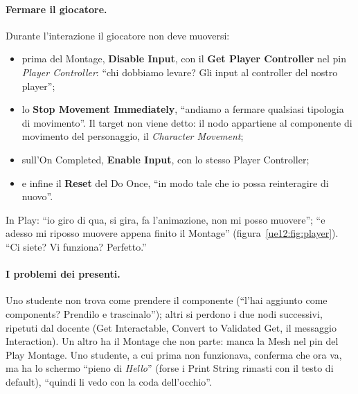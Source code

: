 \paragraph{Fermare il giocatore.} Durante l'interazione il giocatore non deve muoversi:
\begin{itemize}
  \item prima del Montage, \textbf{Disable Input}, con il \textbf{Get Player Controller}
        nel pin \emph{Player Controller}: ``chi dobbiamo levare? Gli input al controller del
        nostro player'';
  \item lo \textbf{Stop Movement Immediately}, ``andiamo a fermare qualsiasi tipologia
        di movimento''. Il target non viene detto: il nodo appartiene al componente di
        movimento del personaggio, il \emph{Character Movement};
  \item sull'On Completed, \textbf{Enable Input}, con lo stesso Player Controller;
  \item e infine il \textbf{Reset} del Do Once, ``in modo tale che io possa reinteragire di
        nuovo''.
\end{itemize}
In Play: ``io giro di qua, si gira, fa l'animazione, non mi posso muovere''; ``e adesso mi
riposso muovere appena finito il Montage'' (figura~\ref{ue12:fig:player}). ``Ci siete? Vi
funziona? Perfetto.''

\paragraph{I problemi dei presenti.} Uno studente non trova come prendere il componente
(``l'hai aggiunto come components? Prendilo e trascinalo''); altri si perdono i due nodi
successivi, ripetuti dal docente (Get Interactable, Convert to Validated Get, il messaggio
Interaction). Un altro ha il Montage che non parte: manca la Mesh nel pin del Play Montage.
Uno studente, a cui prima non funzionava, conferma che ora va, ma ha lo
schermo ``pieno di \emph{Hello}'' (forse i Print String rimasti con il testo di default),
``quindi li vedo con la coda dell'occhio''.

